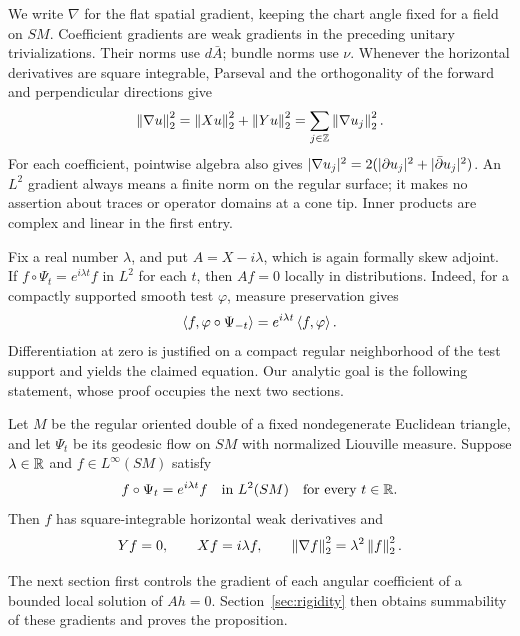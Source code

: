 We write \(\nabla\) for the flat spatial gradient, keeping the chart
angle fixed for a field on \(SM\). Coefficient gradients are weak
gradients in the preceding unitary trivializations. Their norms use
\(d\bar A\); bundle norms use \(\nu\). Whenever the horizontal
derivatives are square integrable, Parseval and the orthogonality of
the forward and perpendicular directions give
\begin{equation}\label{eq:gradient}
 \left\lVert\nabla u\right\rVert_2^2
 =\left\lVert Xu\right\rVert_2^2+\left\lVert Yu\right\rVert_2^2
 =\sum_{j\in\mathbb Z}\left\lVert\nabla u_j\right\rVert_2^2.
\end{equation}
For each coefficient, pointwise algebra also gives
\(\lvert\nabla u_j\rvert^2
=2(\lvert\partial u_j\rvert^2+\lvert\bar\partial u_j\rvert^2)\).
An \(L^2\) gradient always means a finite norm on the regular surface;
it makes no assertion about traces or operator domains at a cone tip.
Inner products are complex and linear in the first entry.

Fix a real number \(\lambda\), and put \(A=X-i\lambda\), which is
again formally skew adjoint. If
\(f\circ\Psi_t=e^{i\lambda t}f\) in \(L^2\) for each \(t\), then
\(Af=0\) locally in distributions. Indeed, for a compactly supported
smooth test \(\varphi\), measure preservation gives
\[
 \left\langle f,\varphi\circ\Psi_{-t}\right\rangle
 =e^{i\lambda t}\left\langle f,\varphi\right\rangle.
\]
Differentiation at zero is justified on a compact regular neighborhood
of the test support and yields the claimed equation. Our analytic goal
is the following statement, whose proof occupies the next two sections.

\begin{proposition}\label{prop:rigidity}
Let \(M\) be the regular oriented double of a fixed nondegenerate
Euclidean triangle, and let \(\Psi_t\) be its geodesic flow on \(SM\)
with normalized Liouville measure. Suppose \(\lambda\in\mathbb R\) and
\(f\in L^\infty(SM)\) satisfy
\[
 f\circ\Psi_t=e^{i\lambda t}f
 \quad\text{in }L^2(SM)\quad\text{for every }t\in\mathbb R.
\]
Then \(f\) has square-integrable horizontal weak derivatives and
\[
 Yf=0,\qquad Xf=i\lambda f,\qquad
 \left\lVert\nabla f\right\rVert_2^2=\lambda^2\left\lVert f\right\rVert_2^2.
\]
\end{proposition}

The next section first controls the gradient of each angular
coefficient of a bounded local solution of \(Ah=0\).
Section~\ref{sec:rigidity} then obtains summability of these gradients
and proves the proposition.

